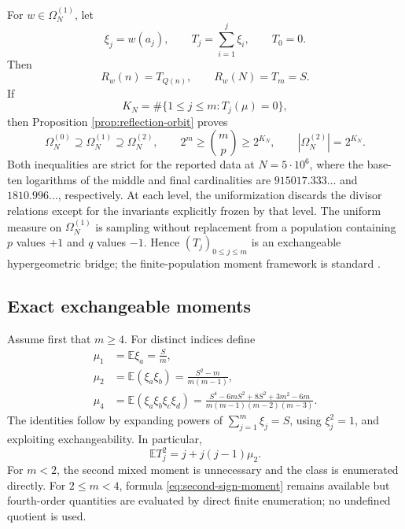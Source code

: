 \documentclass[11pt,reqno]{amsart}
\numberwithin{equation}{section}
\theoremstyle{plain}
\theoremstyle{definition}
\theoremstyle{remark}
\newcommand{\E}{\mathbb E}
\newcommand{\Om}{\Omega}
\begin{document}
For \(w\in\Om_N^{(1)}\), let
\begin{equation}
\xi_j=w(a_j),\qquad
T_j=\sum_{i=1}^{j}\xi_i,\qquad T_0=0.
\label{eq:support-time-path}
\end{equation}
Then
\begin{equation}
R_w(n)=T_{Q(n)},\qquad R_w(N)=T_m=S.
\label{eq:integer-support-path-link}
\end{equation}
If
\begin{equation}
K_N=\#\{1\leq j\leq m:T_j(\mu)=0\},
\label{eq:number-completed-excursions}
\end{equation}
then Proposition \ref{prop:reflection-orbit} proves
\begin{equation}
\Om_N^{(0)}\supseteq\Om_N^{(1)}\supseteq\Om_N^{(2)},
\qquad
2^m\geq\binom{m}{p}\geq2^{K_N},
\qquad |\Om_N^{(2)}|=2^{K_N}.
\label{eq:class-hierarchy}
\end{equation}
Both inequalities are strict for the reported data at \(N=5\cdot10^6\),
where the base-ten logarithms of the middle and final cardinalities are
\(915017.333\ldots\) and \(1810.996\ldots\), respectively.  At each level,
the uniformization discards the divisor relations except for the invariants
explicitly frozen by that level.
The uniform measure on \(\Om_N^{(1)}\) is sampling without replacement from
a population containing \(p\) values \(+1\) and \(q\) values \(-1\).  Hence
\((T_j)_{0\leq j\leq m}\) is an exchangeable hypergeometric bridge; the
finite-population moment framework is standard \cite{Cochran1977}.

\subsection{Exact exchangeable moments}
\label{subsec:exchangeable-moments}

Assume first that \(m\geq4\).  For distinct indices define
\begin{align}
\mu_1&=\E\xi_a=\frac{S}{m},
\label{eq:first-sign-moment}\\
\mu_2&=\E(\xi_a\xi_b)
=\frac{S^2-m}{m(m-1)},
\label{eq:second-sign-moment}\\
\mu_4&=\E(\xi_a\xi_b\xi_c\xi_d)
=\frac{S^4-6mS^2+8S^2+3m^2-6m}
{m(m-1)(m-2)(m-3)}.
\label{eq:fourth-sign-moment}
\end{align}
The identities follow by expanding powers of
\(\sum_{j=1}^m\xi_j=S\), using \(\xi_j^2=1\), and exploiting
exchangeability.  In particular,
\begin{equation}
\E T_j^2=j+j(j-1)\mu_2.
\label{eq:partial-square-mean}
\end{equation}
For \(m<2\), the second mixed moment is unnecessary and the class is
enumerated directly.  For \(2\leq m<4\), formula
\eqref{eq:second-sign-moment} remains available but fourth-order quantities
are evaluated by direct finite enumeration; no undefined quotient is used.
\end{document}
